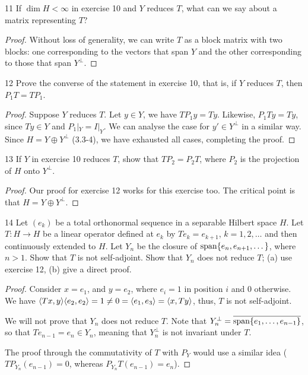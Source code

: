 \begin{exercise}{11}
If $\operatorname{dim} H < \infty$ in exercise 10 and $Y$ reduces $T$, what can we say about a matrix representing $T$?
\end{exercise}
\begin{proof}
Without loss of generality, we can write $T$ as a block matrix with two blocks:
one corresponding to the vectors that span $Y$ and the other corresponding to those that span $Y^\perp$.
\end{proof} 

\begin{exercise}{12}
Prove the converse of the statement in exercise 10, that is, if $Y$ reduces $T$, then $P_1 T = T P_1$.
\end{exercise}
\begin{proof}
Suppose $Y$ reduces $T$.
Let $y \in Y$, we have $T P_1 y = T y$.
Likewise, $P_1 T y = T y$, since $Ty \in Y$ and $P_1|_Y = I|_Y$.
We can analyse the case for $y' \in Y^\perp$ in a similar way.
Since $H = Y \oplus Y^\perp$ (3.3-4), we have exhausted all cases, completing the proof.
\end{proof} 

\begin{exercise}{13}
If $Y$ in exercise 10 reduces $T$, show that $T P_2 = P_2 T$, where $P_2$ is the projection of $H$ onto $Y^\perp$.
\end{exercise}
\begin{proof}
Our proof for exercise 12 works for this exercise too.
The critical point is that $H = Y \oplus Y^\perp$.
\end{proof} 

\begin{exercise}{14}
Let $(e_k)$ be a total orthonormal sequence in a separable Hilbert space $H$.
Let $T: H \to H$ be a linear operator defined at $e_k$ by $T e_k = e_{k+1}$, $k = 1, 2, \dots$ and then continuously extended to $H$.
Let $Y_n$ be the closure of $\operatorname*{span} \{e_n, e_{n+1}, \dots\}$, where $n > 1$.
Show that $T$ is not self-adjoint.
Show that $Y_n$ does not reduce $T$;
(a) use exercise 12, (b) give a direct proof.
\end{exercise}
\begin{proof}
Consider $x = e_1$, and $y = e_2$, where $e_i = 1$ in position $i$ and 0 otherwise.
We have $\langle Tx, y\rangle \langle e_2, e_2\rangle = 1 \neq 0 = \langle e_1, e_3\rangle = \langle x, Ty\rangle$, thus, $T$ is not self-adjoint.

We will not prove that $Y_n$ does not reduce $T$.
Note that $Y_n^\perp = \overline{\operatorname*{span}\{e_1, \dots, e_{n-1}\}}$, so that $T e_{n-1} = e_n \in Y_n$, meaning that $Y_n^\perp$ is not invariant under $T$.

The proof through the commutativity of $T$ with $P_Y$ would use a similar idea ($T P_{Y_n} (e_{n-1}) = 0$, whereas $P_{Y_n} T (e_{n-1}) = e_n$).
\end{proof} 

